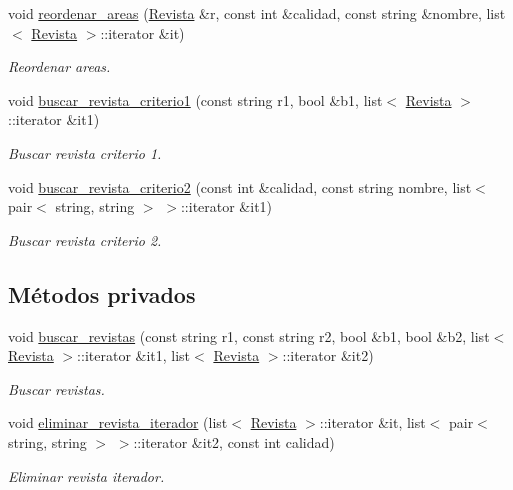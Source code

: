 \begin{DoxyCompactItemize}
void \hyperlink{class_biblioteca_a3ebe216c47fd4163be884ae33673e9c9}{reordenar\-\_\-areas} (\hyperlink{class_revista}{Revista} \&r, const int \&calidad, const string \&nombre, list$<$ \hyperlink{class_revista}{Revista} $>$\-::iterator \&it)
\begin{DoxyCompactList}\small\item\em Reordenar areas. \end{DoxyCompactList}\item 
void \hyperlink{class_biblioteca_a7cd1f0c187ed2775302182f8c819b6c7}{buscar\-\_\-revista\-\_\-criterio1} (const string r1, bool \&b1, list$<$ \hyperlink{class_revista}{Revista} $>$\-::iterator \&it1)
\begin{DoxyCompactList}\small\item\em Buscar revista criterio 1. \end{DoxyCompactList}\item 
void \hyperlink{class_biblioteca_aecaaa308d6469f9d4fa4bfeaa22bb6f7}{buscar\-\_\-revista\-\_\-criterio2} (const int \&calidad, const string nombre, list$<$ pair$<$ string, string $>$ $>$\-::iterator \&it1)
\begin{DoxyCompactList}\small\item\em Buscar revista criterio 2. \end{DoxyCompactList}\end{DoxyCompactItemize}
\subsection*{Métodos privados}
\begin{DoxyCompactItemize}
\item 
void \hyperlink{class_biblioteca_a71069c0ca59f1e4dd6a481a9ccd90485}{buscar\-\_\-revistas} (const string r1, const string r2, bool \&b1, bool \&b2, list$<$ \hyperlink{class_revista}{Revista} $>$\-::iterator \&it1, list$<$ \hyperlink{class_revista}{Revista} $>$\-::iterator \&it2)
\begin{DoxyCompactList}\small\item\em Buscar revistas. \end{DoxyCompactList}\item 
void \hyperlink{class_biblioteca_a8356a46fadc17bd271a1877cb30901fa}{eliminar\-\_\-revista\-\_\-iterador} (list$<$ \hyperlink{class_revista}{Revista} $>$\-::iterator \&it, list$<$ pair$<$ string, string $>$ $>$\-::iterator \&it2, const int calidad)
\begin{DoxyCompactList}\small\item\em Eliminar revista iterador. \end{DoxyCompactList}\end{DoxyCompactItemize}
